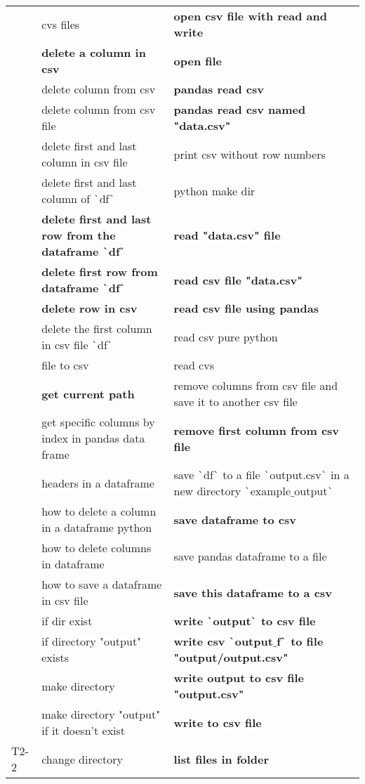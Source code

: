 \begin{longtable}{lLL}
& cvs files & \textbf{open csv file with read and write} \\
& \textbf{delete a column in csv} & \textbf{open file} \\
& delete column from csv & \textbf{pandas read csv} \\
& delete column from csv file & \textbf{pandas read csv named "data.csv"} \\
& delete first and last column in csv file & print csv without row numbers \\
& delete first and last column of \texttt{\`}df\texttt{\`} & python make dir \\
& \textbf{delete first and last row from the dataframe \texttt{\`}df\texttt{\`}} & \textbf{read "data.csv" file} \\
& \textbf{delete first row from dataframe \texttt{\`}df\texttt{\`}} & \textbf{read csv file "data.csv"} \\
& \textbf{delete row in csv} & \textbf{read csv file using pandas} \\
& delete the first column in csv file \texttt{\`}df\texttt{\`} & read csv pure python \\
& file to csv & read cvs \\
& \textbf{get current path} & remove columns from csv file and save it to another csv file \\
& get specific columns by index in pandas data frame & \textbf{remove first column from csv file} \\
& headers in a dataframe & save \texttt{\`}df\texttt{\`} to a file \texttt{\`}output.csv\texttt{\`} in a new directory \texttt{\`}example$\_$output\texttt{\`} \\
& how to delete a column in a dataframe python & \textbf{save dataframe to csv} \\
& how to delete columns in dataframe & save pandas dataframe to a file \\
& how to save a dataframe in csv file & \textbf{save this dataframe to a csv} \\
& if dir exist & \textbf{write \texttt{\`}output\texttt{\`} to csv file} \\
& if directory "output" exists & \textbf{write csv \texttt{\`}output$\_$f\texttt{\`} to file "output/output.csv"} \\
& make directory & \textbf{write output to csv file "output.csv"} \\
& make directory "output" if it doesn't exist & \textbf{write to csv file} \\
T2-2 & change directory & \textbf{list files in folder} \\

\end{longtable}
